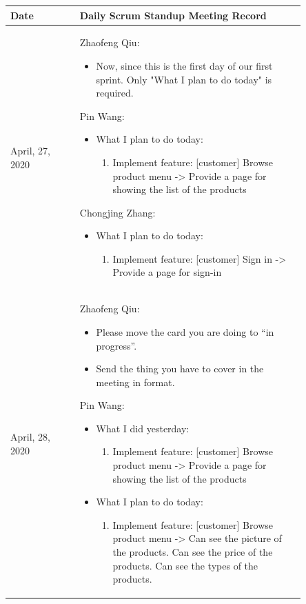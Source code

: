 \documentclass{report}
\begin{document}
\clearpage
\begin{tabularx}{0.95\linewidth}{%
  >{\raggedright\arraybackslash}p{0.2\linewidth}%
  >{\raggedright\arraybackslash}p{0.65\linewidth}}%
  \toprule
  Date & Daily Scrum Standup Meeting Record\\
  \midrule
  April, 27, 2020
  & 
  Zhaofeng Qiu:
  \begin{itemize}
    \item Now, since this is the first day of our first sprint. Only "What I plan to do today" is required.
  \end{itemize}
  Pin Wang:
  \begin{itemize}
    \item What I plan to do today: 
    \begin{enumerate}
      \item Implement feature: [customer] Browse product menu -> Provide a page for showing the list of the products
    \end{enumerate}
  \end{itemize}
  Chongjing Zhang:
  \begin{itemize}
    \item What I plan to do today: 
    \begin{enumerate}
      \item Implement feature: [customer] Sign in -> Provide a page for sign-in
    \end{enumerate}
  \end{itemize}
  \\
  \midrule
  April, 28, 2020
  & 
  Zhaofeng Qiu:
  \begin{itemize}
    \item Please move the card you are doing to “in progress”.
    \item Send the thing you have to cover in the meeting in format.
  \end{itemize}
  Pin Wang:
  \begin{itemize}
    \item What I did yesterday: 
    \begin{enumerate}
      \item Implement feature: [customer] Browse product menu -> Provide a page for showing the list of the products
    \end{enumerate}
    \item What I plan to do today: 
    \begin{enumerate}
      \item Implement feature: [customer] Browse product menu -> Can see the picture of the products. Can see the price of the products. Can see the types of the products.

\end{enumerate}
\end{itemize}
\end{tabularx}
\end{document}
